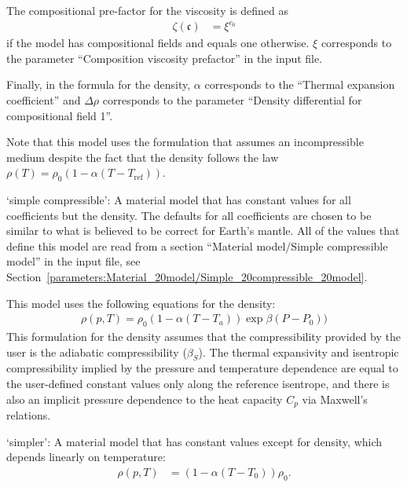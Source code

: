 \begin{itemize}
The compositional pre-factor for the viscosity is defined as \begin{align}  \zeta(\mathfrak c) &= \xi^{c_0}\end{align} if the model has compositional fields and equals one otherwise. $\xi$ corresponds to the parameter ``Composition viscosity prefactor'' in the input file.

Finally, in the formula for the density, $\alpha$ corresponds to the ``Thermal expansion coefficient'' and $\Delta\rho$ corresponds to the parameter ``Density differential for compositional field 1''.

Note that this model uses the formulation that assumes an incompressible medium despite the fact that the density follows the law $\rho(T)=\rho_0(1-\alpha(T-T_{\text{ref}}))$. 


`simple compressible': A material model that has constant values for all coefficients but the density. The defaults for all coefficients are chosen to be similar to what is believed to be correct for Earth's mantle. All of the values that define this model are read from a section ``Material model/Simple compressible model'' in the input file, see Section~\ref{parameters:Material_20model/Simple_20compressible_20model}.

This model uses the following equations for the density: \begin{align}  \rho(p,T) = \rho_0              \left(1-\alpha (T-T_a)\right)               \exp{\beta (P-P_0))}\end{align}This formulation for the density assumes that the compressibility provided by the user is the adiabatic compressibility ($\beta_S$). The thermal expansivity and isentropic compressibility implied by the pressure and temperature dependence are equal to the user-defined constant values only along the reference isentrope, and there is also an implicit pressure dependence to the heat capacity $C_p$ via Maxwell's relations.

`simpler': A material model that has constant values except for density, which depends linearly on temperature: \begin{align}  \rho(p,T) &= \left(1-\alpha (T-T_0)\right)\rho_0.\end{align}


\end{itemize}
